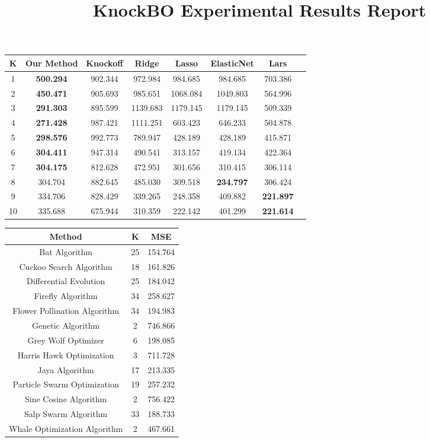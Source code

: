 \documentclass{article}
\title{KnockBO Experimental Results Report}
\begin{document}
\maketitle

\begin{table}[H]
  \centering
  	\begin{tabular}{cccccccc}
	\toprule
	K & Our Method & Knockoff & Ridge & Lasso & ElasticNet & Lars  \\
	\midrule
	1 & \textbf{500.294} & 902.344 & 972.984 & 984.685 & 984.685 & 703.386 \\
	2 & \textbf{450.471} & 905.693 & 985.651 & 1068.084 & 1049.803 & 564.996 \\
	3 & \textbf{291.303} & 895.599 & 1139.683 & 1179.145 & 1179.145 & 509.339 \\
	4 & \textbf{271.428} & 987.421 & 1111.251 & 603.423 & 646.233 & 504.878 \\
	5 & \textbf{298.576} & 992.773 & 789.947 & 428.189 & 428.189 & 415.871 \\
	6 & \textbf{304.411} & 947.314 & 490.541 & 313.157 & 419.134 & 422.364 \\
	7 & \textbf{304.175} & 812.628 & 472.951 & 301.656 & 310.415 & 306.114 \\
	8 & 304.704 & 882.645 & 485.030 & 309.518 & \textbf{234.797} & 306.424 \\
	9 & 334.706 & 828.429 & 339.265 & 248.358 & 409.882 & \textbf{221.897} \\
	10 & 335.688 & 675.944 & 310.359 & 222.142 & 401.299 & \textbf{221.614} \\

	\bottomrule
	\end{tabular}
\end{table}






\begin{table}[H]
  \centering
	\begin{tabular}{ccc}
	\toprule
	Method & K & MSE \\
	\midrule
	Bat Algorithm & 25 & 154.764 \\
	Cuckoo Search Algorithm & 18 & 161.826 \\
	Differential Evolution & 25 & 184.042 \\
	Firefly Algorithm & 34 & 258.627 \\
	Flower Pollination Algorithm & 34 & 194.983 \\
	Genetic Algorithm & 2 & 746.866 \\
	Grey Wolf Optimizer & 6 & 198.085 \\
	Harris Hawk Optimization & 3 & 711.728 \\
	Jaya Algorithm & 17 & 213.335 \\
	Particle Swarm Optimization & 19 & 257.232 \\
	Sine Cosine Algorithm & 2 & 756.422 \\
	Salp Swarm Algorithm & 33 & 188.733 \\
	Whale Optimization Algorithm & 2 & 467.661 \\
	\bottomrule
	\end{tabular}

\end{table}
\end{document}
